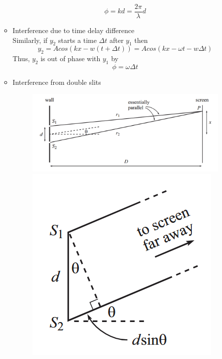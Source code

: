 \documentclass[12pt]{article}
\begin{document}
\begin{enumerate}
\begin{itemize}
        \[\boxed{\phi =kd=\frac{2\pi}{\lambda}d}\]
        \item Interference due to time delay difference
        \\Similarly, if $y_2$ starts a time $\Delta t$ after $y_1$ then
        \[y_2=Acos(kx-w(t+\Delta t))=Acos(kx-\omega t-w\Delta t)\]
        Thus, $y_2$ is out of phase with $y_1$ by
        \[\boxed{\phi =\omega \Delta t}\]
        \item Interference from double slits
\begin{figure}[H]
    \centering
    \begin{minipage}{0.7\textwidth}  
        \includegraphics[width=\textwidth]{Double slit 1.png}
    \end{minipage}\hfill
    \begin{minipage}{0.25\textwidth} 
        \includegraphics[width=\textwidth]{Double slit 2.png}

\end{minipage}
\end{figure}
\end{itemize}
\end{enumerate}
\end{document}
